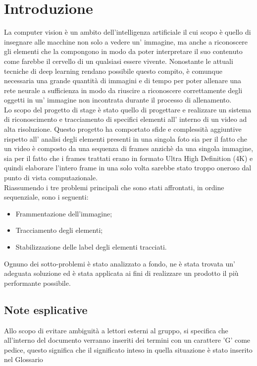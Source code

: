 \section{Introduzione}
La computer vision è un ambito dell'intelligenza artificiale il cui scopo è quello di insegnare alle macchine non solo a vedere un' immagine, ma anche a riconoscere gli elementi che la compongono in modo da poter interpretare il suo contenuto come farebbe il cervello di un qualsiasi essere vivente. Nonostante le attuali tecniche di deep learning rendano possibile questo compito, è comunque necessaria una grande quantità di immagini e di tempo per poter allenare una rete neurale a sufficienza in modo da riuscire a riconoscere correttamente degli oggetti in un' immagine non incontrata durante il processo di allenamento.\\

Lo scopo del progetto di stage è stato quello di progettare e realizzare un sistema di riconoscimento e tracciamento di specifici elementi all' interno di un video ad alta risoluzione. Questo progetto ha comportato sfide e complessità aggiuntive rispetto all' analisi degli elementi presenti in una singola foto sia per il fatto che un video è composto da una sequenza di frames anzichè da una singola immagine, sia per il fatto che i frames trattati erano in formato Ultra High Definition (4K) e quindi elaborare l'intero frame in una solo volta sarebbe stato troppo oneroso dal punto di vista computazionale.\\

Riassumendo i tre problemi principali che sono stati affrontati, in ordine sequenziale, sono i seguenti:
\begin{itemize}
\item Frammentazione dell'immagine;
\item Tracciamento degli elementi;
\item Stabilizzazione delle label degli elementi tracciati.
\end{itemize}
Ognuno dei sotto-problemi è stato analizzato a fondo, ne è stata trovata un' adeguata soluzione ed è stata applicata ai fini di realizzare un prodotto il più performante possibile.

\subsection{Note esplicative}
Allo scopo di evitare ambiguità a lettori esterni al gruppo, si specifica che all'interno del documento verranno inseriti dei termini con un carattere 'G' come pedice, questo significa che il significato inteso in quella situazione è stato inserito nel Glossario

